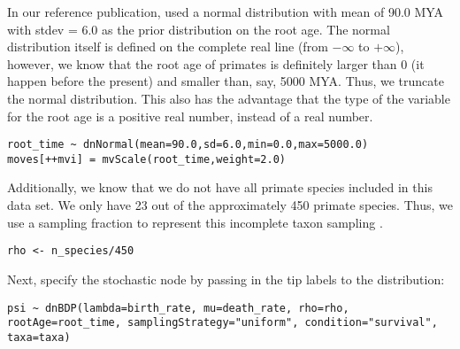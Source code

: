 In our reference publication, \cite{Perelman2011} used a normal distribution with mean of 90.0 MYA with stdev = 6.0 as the prior distribution on the root age.
The normal distribution itself is defined on the complete real line (\IE from $-\infty$ to $+\infty$), however, we know that the root age of primates is definitely larger than 0 (it happen before the present) and smaller than, say, 5000 MYA.
Thus, we truncate the normal distribution.
This also has the advantage that the type of the variable for the root age is a positive real number, instead of a real number.
{\tt \begin{snugshade*}
\begin{lstlisting}
root_time ~ dnNormal(mean=90.0,sd=6.0,min=0.0,max=5000.0)
moves[++mvi] = mvScale(root_time,weight=2.0)
\end{lstlisting}
\end{snugshade*}}

Additionally, we know that we do not have all primate species included in this data set.
We only have 23 out of the approximately 450 primate species.
Thus, we use a sampling fraction to represent this incomplete taxon sampling \citep{Hoehna2011,Hoehna2014a}.
{\tt \begin{snugshade*}
\begin{lstlisting}
rho <- n_species/450
\end{lstlisting}
\end{snugshade*}}

Next, specify the  stochastic node by passing in the tip labels  to the  distribution:
{\tt \begin{snugshade*}
\begin{lstlisting}
psi ~ dnBDP(lambda=birth_rate, mu=death_rate, rho=rho, rootAge=root_time, samplingStrategy="uniform", condition="survival", taxa=taxa)
\end{lstlisting}
\end{snugshade*}}

